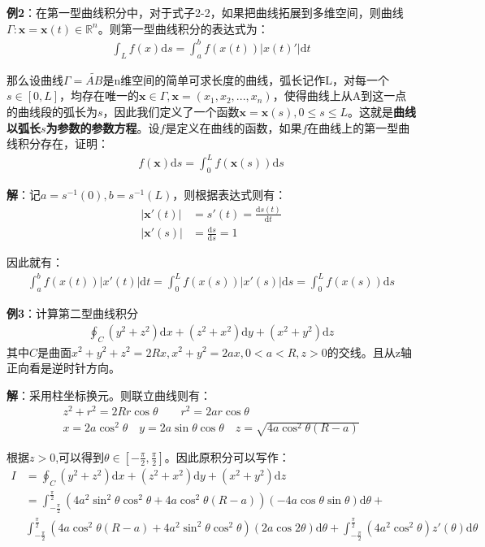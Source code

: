 \documentclass{ctexart}
\let\oldtextbf\textbf
\renewcommand{\textbf}[1]{\textcolor{brown!50!red}{\oldtextbf{#1}}}
\begin{document}
\textbf{\color{brown!50!red}例2}：在第一型曲线积分中，对于式子2-2，如果把曲线拓展到多维空间，则曲线$\Gamma: \bm{x}=\bm{x}(t)\in\mathbb{R}^n$。则第一型曲线积分的表达式为：
\begin{align*}
    \int_L f(x)\mathrm{d}s=\int_a^bf(x(t))|x(t)'|\mathrm{d}t
\end{align*}

那么设曲线$\Gamma=\widetilde{AB}$是n维空间的简单可求长度的曲线，弧长记作L，对每一个$s\in[0,L]$，均存在唯一的$\bm{x}\in\Gamma,\bm{x}=(x_1,x_2,...,x_n)$，使得曲线上从A到这一点的曲线段的弧长为$s$，因此我们定义了一个函数$\bm{x}=\bm{x}(s),0\leq s\leq L$。这就是\textbf{\color{brown!50!red}曲线以弧长$s$为参数的参数方程}。设$f$是定义在曲线的函数，如果$f$在曲线上的第一型曲线积分存在，证明：
\begin{align*}
f(\bm{x} )\mathrm{d}s=\int_0^Lf(\bm{x} (s))\mathrm{d}s   
\end{align*}

\textbf{\color{brown!50!red}解}：记$a=s^{-1}(0),b=s^{-1}(L)$，则根据表达式则有：
\begin{align*}
|\bm{x}'(t)|&=s'(t)=\frac{\mathrm{d}s(t) }{\mathrm{d}t } \\
|\bm{x}'(s)|&=\frac{\mathrm{d}s }{\mathrm{d}s }=1   
\end{align*}

因此就有：
\begin{align*}
\int_a^b f(x(t))|x'(t)|\mathrm{d}t=\int_0^Lf(x(s))|x'(s)|\mathrm{d}s=\int_0^Lf(x(s))\mathrm{d}s  
\end{align*}

\textbf{\color{brown!50!red}例3}：计算第二型曲线积分
\begin{align*}
\oint_C (y^2+z^2)\mathrm{d}x+(z^2+x^2)\mathrm{d}y+(x^2+y^2)\mathrm{d}z
\end{align*}
其中$C$是曲面$x^2+y^2+z^2=2Rx,x^2+y^2=2ax,0<a<R,z>0$的交线。且从z轴正向看是逆时针方向。

\textbf{\color{brown!50!red}解}：采用柱坐标换元。则联立曲线则有：
\begin{align*}
z^2+r^2=2Rr\cos\theta\qquad r^2=2ar\cos\theta\\
x=2a\cos^2\theta\quad y=2a\sin\theta\cos\theta\quad  z=\sqrt{4a\cos^2\theta(R-a)} 
\end{align*}

根据$z>0$,可以得到$\theta\in[-\frac{\pi}{2},\frac{\pi}{2}]$。因此原积分可以写作：
\begin{align*}
I&=\oint_C (y^2+z^2)\mathrm{d}x+(z^2+x^2)\mathrm{d}y+(x^2+y^2)\mathrm{d}z\\
&=\int_{-\frac{\pi}{2}}^{\frac{\pi}{2} }(4a^2\sin^2\theta\cos^2\theta+4a\cos^2\theta(R-a))(-4a\cos\theta\sin\theta)
\mathrm{d}\theta+\\
& \int_{-\frac{\pi}{2}}^{\frac{\pi}{2} }(4a\cos^2\theta(R-a)+4a^2\sin^2\theta\cos^2\theta)(2a\cos 2\theta)
\mathrm{d}\theta+\int_{-\frac{\pi}{2}}^{\frac{\pi}{2} }(4a^2\cos^2\theta)z'(\theta)\mathrm{d}\theta 
\end{align*}
\end{document}
